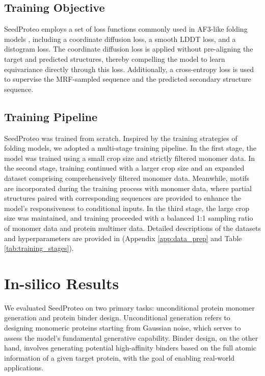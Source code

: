 \documentclass[]{bytedance_seed}
\begin{document}
\subsection{Training Objective}
SeedProteo employs a set of loss functions commonly used in AF3-like folding models \cite{abramsonAccurateStructurePrediction2024}, including a coordinate diffusion loss, a smooth LDDT loss, and a distogram loss. The coordinate diffusion loss is applied without pre-aligning the target and predicted structures, thereby compelling the model to learn equivariance directly through this loss. Additionally, a cross-entropy loss is used to supervise the MRF-sampled sequence and the predicted secondary structure sequence.

\subsection{Training Pipeline}
SeedProteo was trained from scratch. Inspired by the training strategies of folding models, we adopted a multi-stage training pipeline. In the first stage, the model was trained using a small crop size and strictly filtered monomer data. In the second stage, training continued with a larger crop size and an expanded dataset comprising comprehensively filtered monomer data. Meanwhile, motifs are incorporated during the training process with monomer data, where partial structures paired with corresponding sequences are provided to enhance the model’s responsiveness to conditional inputs. In the third stage, the large crop size was maintained, and training proceeded with a balanced 1:1 sampling ratio of monomer data and protein multimer data. Detailed descriptions of the datasets and hyperparameters are provided in (Appendix \ref{app:data_prep} and Table \ref{tab:training_stages}).










\section{In-silico Results}
We evaluated SeedProteo on two primary tasks: unconditional protein monomer generation and protein binder design. Unconditional generation refers to designing monomeric proteins starting from Gaussian noise, which serves to assess the model's fundamental generative capability. Binder design, on the other hand, involves generating potential high-affinity binders based on the full atomic information of a given target protein, with the goal of enabling real-world applications.
\end{document}
